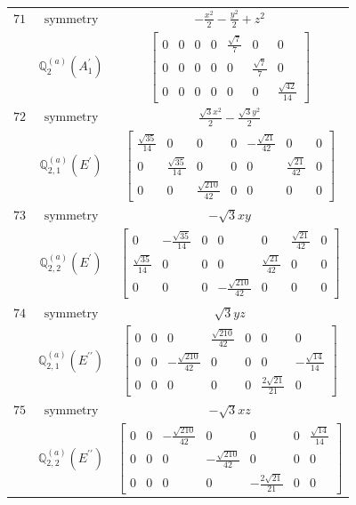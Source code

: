 \documentclass[fleqn,8pt,landscape]{jsarticle}
\begin{document}
\begin{longtable}{ccc}
$ 71 $ & $ \text{symmetry} $ & $ - \frac{x^{2}}{2} - \frac{y^{2}}{2} + z^{2} $ \\
$  $ & $ \mathbb{Q}_{2}^{(a)}(A_{1}^{\prime}) $ & $ \begin{bmatrix} 0 & 0 & 0 & 0 & \frac{\sqrt{7}}{7} & 0 & 0 \\ 0 & 0 & 0 & 0 & 0 & \frac{\sqrt{7}}{7} & 0 \\ 0 & 0 & 0 & 0 & 0 & 0 & \frac{\sqrt{42}}{14} \end{bmatrix} $ \\ \hline
$ 72 $ & $ \text{symmetry} $ & $ \frac{\sqrt{3} x^{2}}{2} - \frac{\sqrt{3} y^{2}}{2} $ \\
$  $ & $ \mathbb{Q}_{2,1}^{(a)}(E^{\prime}) $ & $ \begin{bmatrix} \frac{\sqrt{35}}{14} & 0 & 0 & 0 & - \frac{\sqrt{21}}{42} & 0 & 0 \\ 0 & \frac{\sqrt{35}}{14} & 0 & 0 & 0 & \frac{\sqrt{21}}{42} & 0 \\ 0 & 0 & \frac{\sqrt{210}}{42} & 0 & 0 & 0 & 0 \end{bmatrix} $ \\ \hline
$ 73 $ & $ \text{symmetry} $ & $ - \sqrt{3} x y $ \\
$  $ & $ \mathbb{Q}_{2,2}^{(a)}(E^{\prime}) $ & $ \begin{bmatrix} 0 & - \frac{\sqrt{35}}{14} & 0 & 0 & 0 & \frac{\sqrt{21}}{42} & 0 \\ \frac{\sqrt{35}}{14} & 0 & 0 & 0 & \frac{\sqrt{21}}{42} & 0 & 0 \\ 0 & 0 & 0 & - \frac{\sqrt{210}}{42} & 0 & 0 & 0 \end{bmatrix} $ \\ \hline
$ 74 $ & $ \text{symmetry} $ & $ \sqrt{3} y z $ \\
$  $ & $ \mathbb{Q}_{2,1}^{(a)}(E^{\prime\prime}) $ & $ \begin{bmatrix} 0 & 0 & 0 & \frac{\sqrt{210}}{42} & 0 & 0 & 0 \\ 0 & 0 & - \frac{\sqrt{210}}{42} & 0 & 0 & 0 & - \frac{\sqrt{14}}{14} \\ 0 & 0 & 0 & 0 & 0 & \frac{2 \sqrt{21}}{21} & 0 \end{bmatrix} $ \\ \hline
$ 75 $ & $ \text{symmetry} $ & $ - \sqrt{3} x z $ \\
$  $ & $ \mathbb{Q}_{2,2}^{(a)}(E^{\prime\prime}) $ & $ \begin{bmatrix} 0 & 0 & - \frac{\sqrt{210}}{42} & 0 & 0 & 0 & \frac{\sqrt{14}}{14} \\ 0 & 0 & 0 & - \frac{\sqrt{210}}{42} & 0 & 0 & 0 \\ 0 & 0 & 0 & 0 & - \frac{2 \sqrt{21}}{21} & 0 & 0 \end{bmatrix} $ \\ \hline

\end{longtable}
\end{document}
